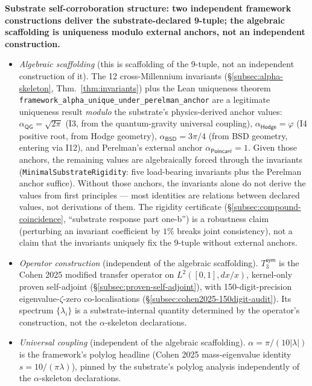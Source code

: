 \documentclass[11pt,a4paper]{amsart}
\theoremstyle{plain}
\theoremstyle{definition}
\begin{document}
\textbf{Substrate self-corroboration structure: two independent framework constructions deliver the substrate-declared 9-tuple; the algebraic scaffolding is uniqueness modulo external anchors, not an independent construction.}
\begin{itemize}[itemsep=1pt,leftmargin=2em]
\item[(1)] \emph{Algebraic scaffolding} (this is scaffolding of the 9-tuple, not an independent construction of it). The 12 cross-Millennium invariants (\S\ref{subsec:alpha-skeleton}, Thm.~\ref{thm:invariants}) plus the Lean uniqueness theorem \texttt{framework\_alpha\_unique\_under\_perelman\_anchor} are a legitimate uniqueness result \emph{modulo} the substrate's physics-derived anchor values: $\alpha_{\textsf{QG}} = \sqrt{2\pi}$ (I3, from the quantum-gravity universal coupling), $\alpha_{\textsf{Hodge}} = \varphi$ (I4 positive root, from Hodge geometry), $\alpha_{\textsf{BSD}} = 3\pi/4$ (from BSD geometry, entering via I12), and Perelman's external anchor $\alpha_{\textsf{Poincar\'e}} = 1$. Given those anchors, the remaining values are algebraically forced through the invariants (\texttt{MinimalSubstrateRigidity}: five load-bearing invariants plus the Perelman anchor suffice). Without those anchors, the invariants alone do not derive the values from first principles --- most identities are relations between declared values, not derivations of them. The rigidity certificate (\S\ref{subsec:compound-coincidence}, ``substrate response part one-b'') is a robustness claim (perturbing an invariant coefficient by $1\%$ breaks joint consistency), not a claim that the invariants uniquely fix the 9-tuple without external anchors.
\item[(2)] \emph{Operator construction} (independent of the algebraic scaffolding). $T_3^{\textsf{sym}}$ is the Cohen 2025 modified transfer operator on $L^2([0,1], dx/x)$, kernel-only proven self-adjoint (\S\ref{subsec:proven-self-adjoint}), with 150-digit-precision eigenvalue-$\zeta$-zero co-localisations (\S\ref{subsec:cohen2025-150digit-audit}). Its spectrum $\{\lambda_i\}$ is a substrate-internal quantity determined by the operator's construction, not the $\alpha$-skeleton declarations.
\item[(3)] \emph{Universal coupling} (independent of the algebraic scaffolding). $\alpha = \pi/(10|\lambda|)$ is the framework's polylog headline (Cohen 2025 mass-eigenvalue identity $s = 10/(\pi\lambda)$), pinned by the substrate's polylog analysis independently of the $\alpha$-skeleton declarations.
\end{itemize}
\end{document}
